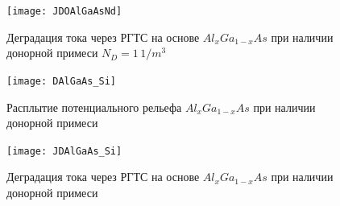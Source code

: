\begin{figure}[h]
	\centering
	\texttt{[image: JDOAlGaAsNd]}
	\caption{Деградация тока через РГТС на основе $Al_{x}Ga_{1−x}As$ при наличии донорной примеси $N_{D}=1\,1/m^{3}$}
	\label{fig:JDOAlGaAsNd}
\end{figure}

\begin{figure}[h]
	\centering
	\texttt{[image: DAlGaAs\_Si]}
	\caption{Расплытие потенциального рельефа $Al_{x}Ga_{1−x}As$ при наличии донорной примеси} 
	\label{fig:DAlGaAs_Si}
\end{figure}

\begin{figure}[h]
	\centering
	\texttt{[image: JDAlGaAs\_Si]}
	\caption{Деградация тока через РГТС на основе $Al_{x}Ga_{1−x}As$ при наличии донорной примеси}
	\label{fig:JDAlGaAs_Si}
\end{figure}
